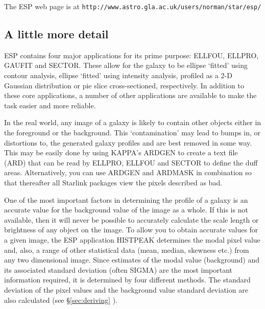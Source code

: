 \documentclass[twoside,11pt]{article}
\newcommand{\htmladdnormallink}[2]{#1}
\newcommand{\xref}[3]{#1}
\newcommand{\xlabel}[1]{}
\begin{document}
The ESP web page is at
\htmladdnormallink{\texttt{http://www.astro.gla.ac.uk/users/norman/star/esp/}}{http://www.astro.gla.ac.uk/users/norman/star/esp/}

%
%

\subsection{A little more detail}
\xlabel{ALITTLEMOREDETAIL}

ESP contains four major applications for its prime purpose: ELLFOU,
ELLPRO, GAUFIT and SECTOR. These allow for the galaxy to be ellipse `fitted' 
using contour analysis, ellipse `fitted' using intensity analysis,
profiled as a 2-D Gaussian distribution or pie slice cross-sectioned, 
respectively. In addition to these core 
applications, a number of other applications are available to make the 
task easier and more reliable.

In the real world, any image of a galaxy is likely to contain other 
objects either in the foreground or the background. This `contamination'
may lead to bumps in, or distortions to, the generated galaxy profiles and
are best removed in some way. This may be easily done by 
using \xref{KAPPA}{sun95}{}'s ARDGEN to create a text file (ARD) that can be read by 
ELLPRO, ELLFOU and SECTOR to define the duff areas. Alternatively, you can 
use ARDGEN and ARDMASK in combination so that thereafter all Starlink
packages view the pixels described as bad.

One of the most important factors in determining the profile of a
galaxy is an accurate value for the background value of the image as a
whole.  If this is not available, then it will never be possible to
accurately calculate the scale length or brightness of any object on
the image.  To allow you to obtain accurate values for a given image,
the ESP application HISTPEAK determines the modal pixel value and,
also, a range of other statistical data (mean, median, skewness etc.)
from any two dimensional image. Since estimates of the modal value
(background) and its associated standard deviation (often SIGMA) are the most
important information required, it is determined by four different
methods. The standard deviation of the pixel values and the background
value standard deviation are also calculated (see \S\ref{sec:deriving} ).
\end{document}

